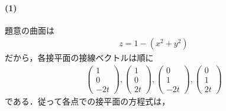 \documentclass[../../main.tex]{subfiles}
\begin{document}
\paragraph{(1)}

題意の曲面は
\begin{align}
  z = 1 - (x^2 + y^2) \label{eq:1}
\end{align}
だから，各接平面の接線ベクトルは順に
\begin{align}
  \begin{pmatrix} 1 \\ 0 \\ -2t
  \end{pmatrix},
  \begin{pmatrix} 1 \\ 0 \\ 2t
  \end{pmatrix},
  \begin{pmatrix} 0 \\ 1 \\ -2t
  \end{pmatrix},
  \begin{pmatrix} 0 \\ 1 \\ 2t
  \end{pmatrix}
\end{align}
である．従って各点での接平面の方程式は，
\end{document}
